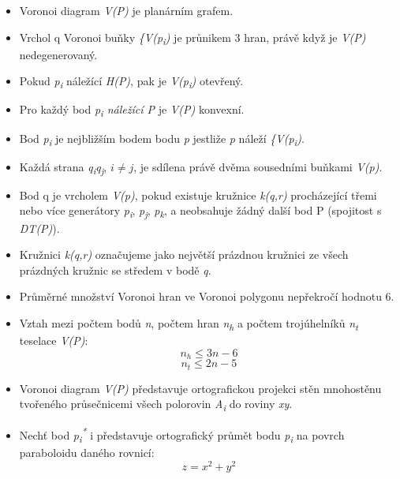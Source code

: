 \begin{itemize}
\item Voronoi diagram \textit{V(P)} je planárním grafem.
\item Vrchol q Voronoi buňky \textit{\{V(p\textsubscript{i})} je průnikem 3 hran, právě když je \textit{V(P)} nedegenerovaný.
\item Pokud \textit{p\textsubscript{i}} náležící \textit{H(P)}, pak je \textit{V(p\textsubscript{i})}  otevřený. 
\item Pro každý bod \textit{p\textsubscript{i} náležící P} je \textit{V(P)} konvexní. 
\item Bod \textit{p\textsubscript{i}} je nejbližším bodem bodu \textit{p}
jestliže \textit{p} náleží \textit{\{V(p\textsubscript{i})}.
\item Každá strana \textit{q\textsubscript{i}q\textsubscript{j}}, \(i \neq j\),
je sdílena právě dvěma sousedními buňkami \textit{V(p)}. 
\item Bod q je vrcholem \textit{V(p)}, pokud existuje kružnice \textit{k(q,r)} procházející třemi
nebo více generátory \textit{p\textsubscript{i}}, \textit{p\textsubscript{j}},
\textit{p\textsubscript{k}}, a neobsahuje žádný další bod P (spojitost s \textit{DT(P)}). 
\item Kružnici \textit{k(q,r)} označujeme jako největší prázdnou kružnici ze všech prázdných kružnic se středem v bodě \textit{q}. 
\item Průměrné množství Voronoi hran ve Voronoi polygonu nepřekročí hodnotu 6. 
\item Vztah mezi počtem bodů \textit{n}, počtem hran \textit{n\textsubscript{h}}
a počtem trojúhelníků \textit{n\textsubscript{t}} teselace \textit{V(P)}:
\[ n_h \leq 3n-6\]
\[ n_t \leq 2n−5\]
\item Voronoi diagram \textit{V(P)} představuje ortografickou projekci stěn
mnohostěnu tvořeného průsečnicemi všech polorovin \textit{A\textsubscript{i}} do roviny \textit{xy}. 
\item Nechť bod \textit{p\textsubscript{i}\textsuperscript{*}} i představuje
ortografický průmět bodu \textit{p\textsubscript{i}} na povrch paraboloidu daného rovnicí:
\[ z = x^2 + y^2 \]
   
\end{itemize}

